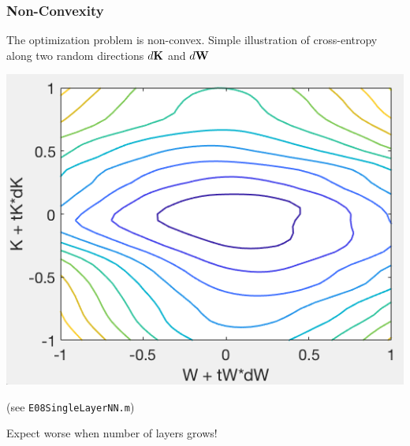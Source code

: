 \documentclass[12pt,fleqn,handout]{beamer}
\begin{document}
\begin{frame}
	\frametitle{Non-Convexity}
	The optimization problem is non-convex. Simple illustration of cross-entropy along two random directions $d{\bf K}$ and $d{\bf W}$

	\begin{center}
		\includegraphics[width=.6\textwidth]{images/nonConvexitySingleLayer}
		
		(see \texttt{E08SingleLayerNN.m})
	\bigskip
	
	Expect worse when number of layers grows!
	\end{center}

\end{frame}
\end{document}
